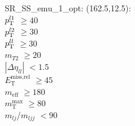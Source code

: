 SR\_SS\_emu\_1\_opt: (162.5,12.5): \\
$p_{\text{T}}^{l1}$ $\geq 40$ \\
$p_{\text{T}}^{l2}$ $\geq 30$ \\
$p_{\text{T}}^{ll}$ $\geq 30$ \\
$m_{T2}$ $\geq 20$ \\
$|\Delta\eta_{ll}|$ $<1.5$ \\
$E_{\text{T}}^{\text{miss,rel}}$ $\geq 45$ \\
$m_{\text{eff}}$ $\geq 180$ \\
$m_{\text{T}}^{\text{max}}$ $\geq 80$ \\
$m_{lj}$/$m_{ljj}$ $<90$ \\
